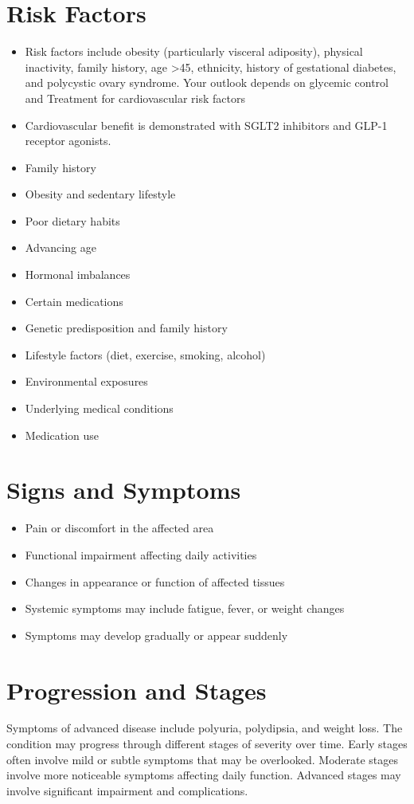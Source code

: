 \section{Risk Factors}
\begin{itemize}[noitemsep]
  \item Risk factors include obesity (particularly visceral adiposity), physical inactivity, family history, age >45, ethnicity, history of gestational diabetes, and polycystic ovary syndrome. Your outlook depends on glycemic control and Treatment for cardiovascular risk factors
  \item Cardiovascular benefit is demonstrated with SGLT2 inhibitors and GLP-1 receptor agonists.
  \item Family history
  \item Obesity and sedentary lifestyle
  \item Poor dietary habits
  \item Advancing age
  \item Hormonal imbalances
  \item Certain medications
  \item Genetic predisposition and family history
  \item Lifestyle factors (diet, exercise, smoking, alcohol)
  \item Environmental exposures
  \item Underlying medical conditions
  \item Medication use
\end{itemize}
\section{Signs and Symptoms}
\begin{itemize}[noitemsep]
  \item Pain or discomfort in the affected area
  \item Functional impairment affecting daily activities
  \item Changes in appearance or function of affected tissues
  \item Systemic symptoms may include fatigue, fever, or weight changes
  \item Symptoms may develop gradually or appear suddenly
\end{itemize}
\section{Progression and Stages}
Symptoms of advanced disease include polyuria, polydipsia, and weight loss. The condition may progress through different stages of severity over time. Early stages often involve mild or subtle symptoms that may be overlooked. Moderate stages involve more noticeable symptoms affecting daily function. Advanced stages may involve significant impairment and complications.
